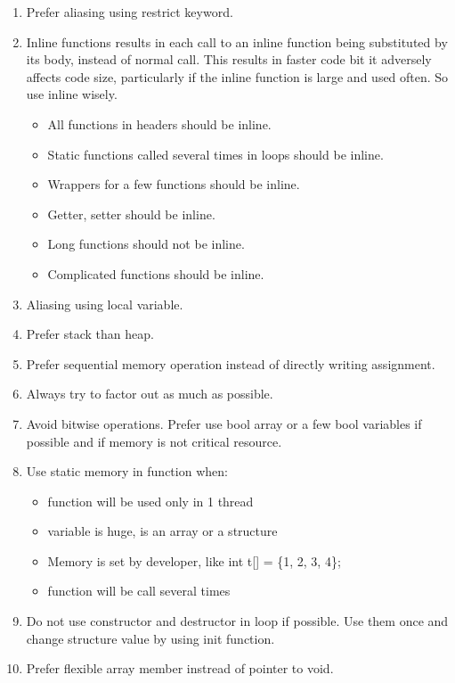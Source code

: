 \begin{enumerate}
    \item Prefer aliasing using restrict keyword.
    \item Inline functions results in each call to an inline function being substituted by its body, instead of normal call. This results in faster code bit it adversely affects code size, particularly if the inline function is large and used often. So use inline wisely.
    \begin{itemize}
        \item All functions in headers should be inline.
        \item Static functions called several times in loops should be inline.
        \item Wrappers for a few functions should be inline.
        \item Getter, setter should be inline.
        \item Long functions should not be inline.
        \item Complicated functions should be inline.
    \end{itemize}
    \item Aliasing using local variable.
    \item Prefer stack than heap.
    \item Prefer sequential memory operation instead of directly writing assignment.
    \item Always try to factor out as much as possible.
    \item Avoid bitwise operations. Prefer use bool array or a few bool variables if possible and if memory is not critical resource.
    \item Use static memory in function when:
        \begin{itemize}
            \item function will be used only in 1 thread
            \item variable is huge, is an array or a structure
            \item Memory is set by developer, like int t[] = \{1, 2, 3, 4\};
            \item function will be call several times
        \end{itemize}
    \item Do not use constructor and destructor in loop if possible. Use them once and change structure value by using init function.
    \item Prefer flexible array member instread of pointer to void.
\end{enumerate}

